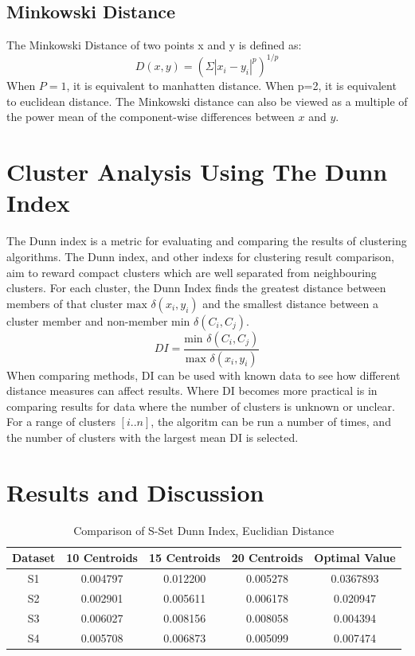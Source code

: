 \documentclass[journal]{IEEEtran}
\begin{document}
\subsection{Minkowski Distance}
The Minkowski Distance of two points x and y is defined as:
$$D(x,y) = (\Sigma|x_{i}-y_{i}|^{p})^{1/p}$$
When $P=1$, it is equivalent to manhatten distance. When p=2, it is equivalent to euclidean distance. The Minkowski distance can also be viewed as a multiple of the power mean of the component-wise differences between $x$ and $y$.
\section{Cluster Analysis Using The Dunn Index}
The Dunn index is a metric for evaluating and comparing the results of clustering algorithms. The Dunn index, and other indexs for clustering result comparison, aim to reward compact clusters which are well separated from neighbouring clusters. For each cluster, the Dunn Index finds the greatest distance between members of that cluster $\textrm{max }\delta(x_{i},y_{i}) $ and the smallest distance between a cluster member and non-member $\textrm{min }  \delta(C_{i}, C_{j})$.
$$DI=\frac{\textrm{min }  \delta(C_{i}, C_{j})}{\textrm{max }\delta(x_{i},y_{i}) }$$
When comparing methods, DI can be used with known data to see how different distance measures can affect results. Where DI becomes more practical is in comparing results for data where the number of clusters is unknown or unclear.
For a range of clusters $[i..n]$, the algoritm can be run a number of times, and the number of clusters with the largest mean DI is selected.

\section{Results and Discussion}
\begin{table}[h]
	\renewcommand{\arraystretch}{1.3}
	
	\caption{Comparison of S-Set Dunn Index, Euclidian Distance}
	\label{table_example}
	\centering
	
	\begin{tabular}{|c|c|c|c|c|}
		\hline
		Dataset & 10 Centroids & 15 Centroids & 20 Centroids & Optimal Value\\
		\hline
		
		S1 & 0.004797  & 0.012200 & 0.005278 & 0.0367893\\
		\hline
		S2 & 0.002901 & 0.005611 & 0.006178 & 0.020947\\
		\hline
		S3 & 0.006027 & 0.008156 & 0.008058 & 0.004394\\
		\hline
		S4 & 0.005708 & 0.006873 & 0.005099 & 0.007474\\
		\hline
	\end{tabular}
\end{table}
\end{document}
